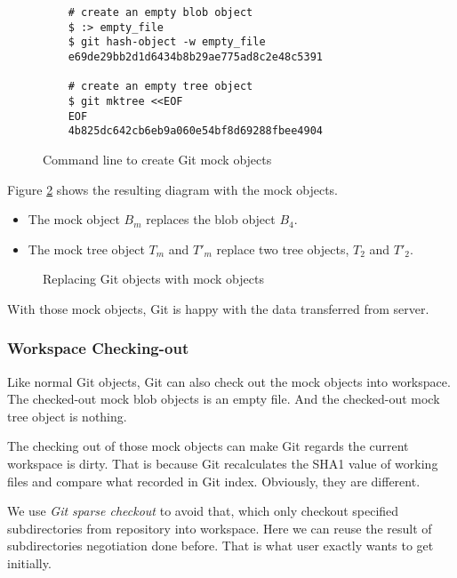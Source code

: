 \documentclass[preprint]{sigplanconf}
\begin{document}
\begin{figure}[htpb]
  \centering
  \begin{verbatim}
    # create an empty blob object
    $ :> empty_file
    $ git hash-object -w empty_file
    e69de29bb2d1d6434b8b29ae775ad8c2e48c5391

    # create an empty tree object
    $ git mktree <<EOF
    EOF
    4b825dc642cb6eb9a060e54bf8d69288fbee4904
  \end{verbatim}
  \caption{Command line to create Git mock objects}
  \label{fig:cmd-create-mock}
\end{figure}

Figure \ref{fig:mock-objects} shows the resulting diagram with the mock
objects.

\begin{itemize}
  \item The mock object $B_m$ replaces the blob object $B_4$.

  \item The mock tree object $T_m$ and $T'_m$ replace two tree objects, $T_2$
    and $T'_2$.
\end{itemize}

\begin{figure}[htpb]
  \centering
  
  \caption{Replacing Git objects with mock objects}
  \label{fig:mock-objects}
\end{figure}

With those mock objects, Git is happy with the data transferred from server.

\subsubsection{Workspace Checking-out}
Like normal Git objects, Git can also check out the mock objects into workspace.
The checked-out mock blob objects is an empty file.
And the checked-out mock tree object is nothing.

The checking out of those mock objects can make Git regards the current
workspace is dirty.
That is because Git recalculates the SHA1 value of working files and compare
what recorded in Git index.
Obviously, they are different.

We use \emph{Git sparse checkout} \cite{sparseco} to avoid that, which only
checkout specified subdirectories from repository into workspace.
Here we can reuse the result of subdirectories negotiation done before.
That is what user exactly wants to get initially.
\end{document}
